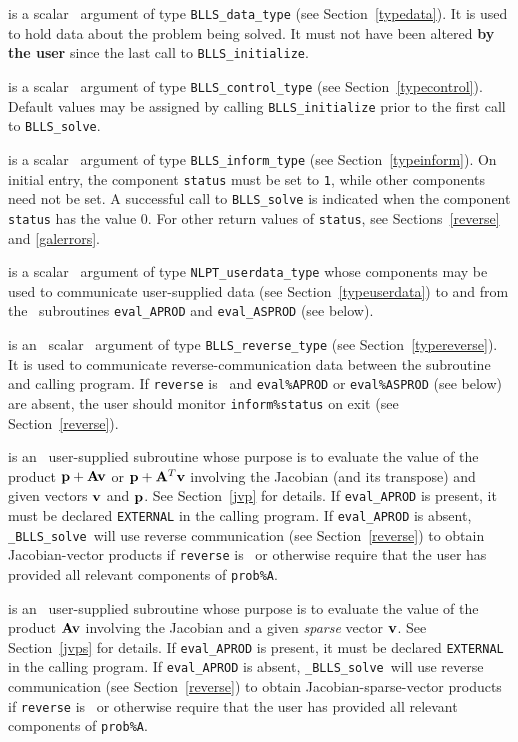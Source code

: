 \documentclass{galahad}
\newcommand{\packagename}{BLLS}
\newcommand{\fullpackagename}{\libraryname\_\packagename}
\newcommand{\solver}{{\tt \fullpackagename\_solve}}
\begin{document}
\begin{description}
 is a scalar \intentinout\ argument of type
{\tt \packagename\_data\_type}
(see Section~\ref{typedata}). It is used to hold data about the problem being
solved. It must not have been altered {\bf by the user} since the last call to
{\tt \packagename\_initialize}.

 is a scalar \intentin\ argument of type
{\tt \packagename\_control\_type}
(see Section~\ref{typecontrol}). Default values may be assigned by calling
{\tt \packagename\_initialize} prior to the first call to
{\tt \packagename\_solve}.

 is a scalar \intentinout\ argument of type
{\tt \packagename\_inform\_type}
(see Section~\ref{typeinform}). On initial entry, the component {\tt status}
must be set to {\tt 1}, while other components need not be set.
A successful call to
{\tt \packagename\_solve}
is indicated when the  component {\tt status} has the value 0.
For other return values of {\tt status}, see Sections~\ref{reverse} and
\ref{galerrors}.

 is a scalar \intentinout\ argument of type
{\tt NLPT\_userdata\_type} whose components may be used
to communicate user-supplied data
(see Section~\ref{typeuserdata})
to and from the \optional\ subroutines
 {\tt eval\_APROD} and {\tt eval\_ASPROD} (see below).

 is an \optional\ scalar \intentinout\ argument of type
{\tt \packagename\_reverse\_type}
(see Section~\ref{typereverse}).
It is used to communicate reverse-communication data between the
subroutine and calling program.
If {\tt reverse} is \present\ and {\tt eval\%APROD} or {\tt eval\%ASPROD}
(see below) are absent, the user should monitor {\tt inform\%status} on exit
(see Section~\ref{reverse}).

 is an \optional\
user-supplied subroutine whose purpose is to evaluate the value of the
product ${\mathbf{p}} + {\mathbf{A}} {\mathbf{v}}$ or ${\mathbf{p}} + {\mathbf{A}}^T {\mathbf{v}}$
involving the Jacobian (and its transpose) and given vectors ${\mathbf{v}}$ and ${\mathbf{p}}$.
See Section~\ref{jvp} for details.
If {\tt eval\_APROD} is present,
it must be declared {\tt EXTERNAL} in the calling program.
If {\tt eval\_APROD} is absent, \solver\ will use reverse communication
(see Section~\ref{reverse})
to obtain Jacobian-vector products if {\tt reverse} is \present\ or
otherwise require that the user has provided all relevant
components of {\tt prob\%A}.

 is an \optional\
user-supplied subroutine whose purpose is to evaluate the value of the
product ${\mathbf{A}} {\mathbf{v}}$  involving the Jacobian and a given {\em sparse}
vector ${\mathbf{v}}$.
See Section~\ref{jvps} for details.
If {\tt eval\_APROD} is present,
it must be declared {\tt EXTERNAL} in the calling program.
If {\tt eval\_APROD} is absent, \solver\ will use reverse communication
(see Section~\ref{reverse})
to obtain Jacobian-sparse-vector products if {\tt reverse} is \present\ or
otherwise require that the user has provided all relevant
components of {\tt prob\%A}.

\end{description}
\end{document}
